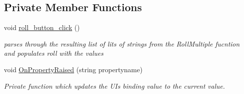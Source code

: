 \subsection*{Private Member Functions}
\begin{DoxyCompactItemize}
\item 
void \mbox{\hyperlink{class_dungeons__n___dragons___manager_1_1_viewmodels_1_1_dice_roll_tab_viewmodel_a9e750e9cd2b0ef48512613dd336459c0}{roll\+\_\+button\+\_\+click}} ()
\begin{DoxyCompactList}\small\item\em parses through the resulting list of lits of strings from the Roll\+Multiple fucntion and populates roll with the values \end{DoxyCompactList}\item 
void \mbox{\hyperlink{class_dungeons__n___dragons___manager_1_1_viewmodels_1_1_dice_roll_tab_viewmodel_aed714f4bed840630e6fe4ddb4f6aa5be}{On\+Property\+Raised}} (string propertyname)
\begin{DoxyCompactList}\small\item\em Private function which updates the UI\textquotesingle{}s binding value to the current value. \end{DoxyCompactList}\end{DoxyCompactItemize}
